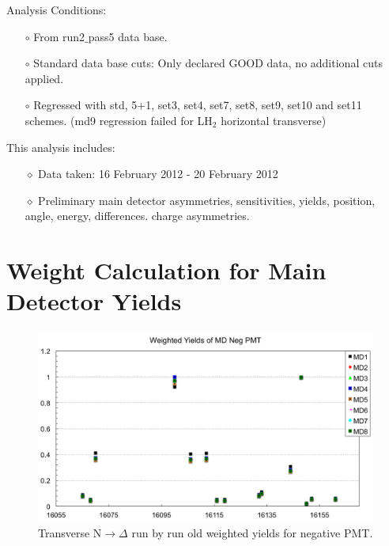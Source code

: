 \noindent
Analysis Conditions:
\begin{itemize}
\doublespacing
\item[$\circ$] From run2$\_$pass5 data base.
\item[$\circ$] Standard data base cuts: Only declared GOOD data, no additional cuts applied.
\item[$\circ$] Regressed with std, 5+1, set3, set4, set7, set8, set9, set10 and set11 schemes. (md9 regression failed for LH$_{2}$ horizontal transverse)
\end{itemize}

\noindent
This analysis includes:
\begin{itemize}
\doublespacing
\item[$\diamond$] Data taken: 16 February 2012 - 20 February 2012
\item[$\diamond$] Preliminary main detector asymmetries, sensitivities, yields, position, angle, energy, differences. charge asymmetries. 
\end{itemize}


\section{Weight Calculation for Main Detector Yields}
\label{Weight Calculation for Main Detector Yields}

\begin{figure}[!h]
	\begin{center}
	\includegraphics[width=15.0cm]{figures/transverseN2DeltaRunByRunWeightedYieldsNegPMT_old}
	\end{center}
	\caption
	{Transverse N$\rightarrow\Delta$ run by run old weighted yields for negative PMT.}
	\label{fig:transverseN2DeltaRunByRunWeightedYieldsNegPMT_old}
\end{figure}

